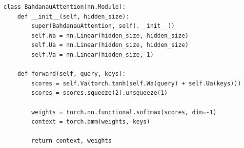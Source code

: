 \begin{listing}
    \begin{verbatim}
class BahdanauAttention(nn.Module):
    def __init__(self, hidden_size):
        super(BahdanauAttention, self).__init__()
        self.Wa = nn.Linear(hidden_size, hidden_size)
        self.Ua = nn.Linear(hidden_size, hidden_size)
        self.Va = nn.Linear(hidden_size, 1)

    def forward(self, query, keys):
        scores = self.Va(torch.tanh(self.Wa(query) + self.Ua(keys)))
        scores = scores.squeeze(2).unsqueeze(1)

        weights = torch.nn.functional.softmax(scores, dim=-1)
        context = torch.bmm(weights, keys)

        return context, weights
    \end{verbatim}
    \caption{Bahdanau Attention used in the Seq2Seq Model}\label{lst:seq2seq_attention}
\end{listing}
